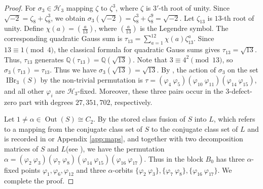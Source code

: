 \documentclass[11pt,a4paper]{article}
\numberwithin{equation}{section}
\theoremstyle{definition}
\theoremstyle{remark}
\newcommand{\IBr}{\operatorname{IBr}}
\newcommand{\Out}{\operatorname{Out}}
\newcommand{\HH}{\mathcal H}
\begin{document}
\begin{proof}
For $\sigma_3\in\HH_3$ mapping $\zeta$ to $\zeta^3$, where $\zeta$ is $3'$-th root of unity.
Since $\sqrt{-2}=\zeta_8+\zeta_8^3$, we obtain $\sigma_3(\sqrt{-2})=\zeta_8^3+\zeta_8^9=\sqrt{-2}$.
Let $\zeta_{13}$ is $13$-th root of unity.
Define $\chi(a)=\left(\frac{a}{13}\right)$,
where $\left(\frac{a}{13}\right)$ is the Legendre symbol. The corresponding quadratic Gauss sum is
$\tau_{13}=\sum_{a=1}^{12}\chi(a)\zeta_{13}^{a}$.
Since $13\equiv 1\pmod{4}$, the classical formula for quadratic Gauss sums gives $\tau_{13}=\sqrt{13}$.
Thus, $\tau_{13}$ generates 
$\mathbb{Q}(\tau_{13})=\mathbb{Q}(\sqrt{13})$.
Note that \(3\equiv4^2\pmod{13}\), so 
\(\sigma_3(\tau_{13})=\tau_{13}\). Thus we have
\(\sigma_3(\sqrt{13})=\sqrt{13}\).    
By \cite[Tables]{T}, the action of $\sigma_3$ on the set $\IBr_3(S)$ by the non-trivial permutation is $\tau=(\varphi_4\ \varphi_5) (\varphi_{10}\ \varphi_{11})(\varphi_{14}\ \varphi_{15})$, and  all other \(\varphi_i\) are $\HH_3$-fixed. Moreover, these three pairs occur in the $3$-defect-zero part with degrees \(27,351,702\), respectively.

Let \(1\neq \alpha\in \Out(S)\cong C_2\). By the stored class fusion of $S$ into $L$, which refers to a mapping from the conjugate class set of $S$ to the conjugate class set of $L$ and is recorded in \cite{OrdData} or Appendix \ref{app:maps}, and  together with two decomposition matrices of $S$ and $L$(see \cite{T,R}), we have the permutation
$\alpha=(\varphi_2\ \varphi_3) (\varphi_7\ \varphi_8)(\varphi_{14}\ \varphi_{15})(\varphi_{16}\ \varphi_{17})$. 
Thus in the block $B_0$ has three  $\alpha$-fixed points $\varphi_1,\varphi_6,\varphi_{12}$ and three $\alpha$-orbits
$\{\varphi_2\ \varphi_3\}, \{\varphi_7\ \varphi_8\}, \{\varphi_{16}\ \varphi_{17}\}$.
We complete the proof.
\end{proof} 
\end{document}
